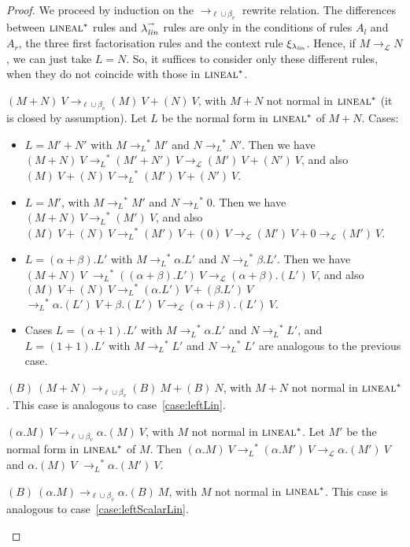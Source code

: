 \documentclass{LMCS}
\newcommand{\olin}{\mbox{\sc lineal}}
\newcommand{\lalin}{\ensuremath{\lambda_{{\it lin}}}}
\newcommand{\xllin}[1]{\ensuremath{\lambda^{\raisebox{0.5ex}{\textrm{\tiny $#1$}}}_{{\it lin}}}}
\newcommand{\llinred}{\xllin{\rightarrow}}
\newcommand{\xto}[1]{\ensuremath{\rightarrow_{#1}}}
\newcommand{\toolin}{\xto{\mathcal{L}}}
\newcommand{\stoolin}{\ensuremath{\xto{L}^{\ast}}}
\newcommand{\toblinred}{\xto{\ell\cup\beta_v}}
\begin{document}
\begin{proof}
  We proceed by induction on the $\toblinred$ rewrite relation.
  The differences between $\olin^*$ rules and $\llinred$ rules are only in the conditions of rules $A_l$ and $A_r$, the three first factorisation rules and the context rule $\xi_{\lalin}$. Hence, if $M\toolin N$, we can just take $L=N$. So, it suffices to consider only these different rules, when they do not coincide with those in $\olin^*$. 
  \begin{myenumerate}
    \item\label{case:leftLin} $(M+N)~V\toblinred (M)~V+(N)~V$, with $M+N$ not normal in $\olin^*$ (it is closed by assumption). Let $L$ be the normal form in $\olin^*$ of $M+N$. Cases:
      \begin{itemize}
	\item $L=M'+N'$ with $M\stoolin M'$ and $N\stoolin N'$. Then we have
	  $
	  (M+N)~V\stoolin (M'+N')~V\toolin(M')~V+(N')~V
	  $,
	  and also
	  $
	  (M)~V+(N)~V\stoolin (M')~V+(N')~V
	  $.
	\item $L=M'$, with $M\stoolin M'$ and $N\stoolin 0$. Then we have
	  $
	  (M+N)~V\stoolin (M')~V
	  $,
	  and also
	  $
	  (M)~V+(N)~V\stoolin(M')~V+(0)~V\toolin(M')~V+0\toolin(M')~V
	  $.
	\item $L=(\alpha+\beta).L'$ with $M\stoolin\alpha.L'$ and $N\stoolin\beta.L'$. Then we have
	  $(M+N)~V$
	  $\stoolin((\alpha+\beta).L')~V\toolin(\alpha+\beta).(L')~V
	  $,
	  and also
	  $  
	  (M)~V+(N)~V \stoolin(\alpha.L')~V+(\beta.L')~V$ $\stoolin\alpha.(L')~V+\beta.(L')~V
	  \toolin(\alpha+\beta).(L')~V
	  $.
	\item Cases $L=(\alpha+1).L'$ with $M\stoolin\alpha.L'$ and $N\stoolin L'$, and $L=(1+1).L'$ with $M\stoolin L'$ and $N\stoolin L'$ are analogous to the previous case.
      \end{itemize}
    \item $(B)~(M+N)\toblinred(B)~M+(B)~N$, with $M+N$ not normal in $\olin^*$. This case is analogous to case~\ref{case:leftLin}.
    \item\label{case:leftScalarLin} $(\alpha.M)~V\toblinred \alpha.(M)~V$, with $M$ not normal in $\olin^*$. Let $M'$ be the normal form in $\olin^*$ of $M$. Then 
      $
      (\alpha.M)~V\stoolin(\alpha.M')~V\toolin\alpha.(M')~V
      $
      and
      $\alpha.(M)~V$
      $\stoolin\alpha.(M')~V$.

    \item $(B)~(\alpha.M)\toblinred\alpha.(B)~M$, with $M$ not normal in $\olin^*$. This case is analogous to case~\ref{case:leftScalarLin}.


\end{myenumerate}
\end{proof}
\end{document}
